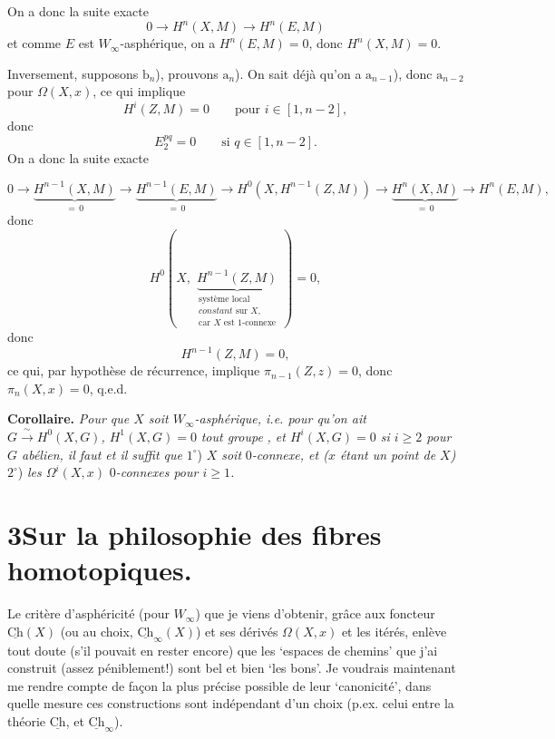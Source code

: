 \documentclass[11pt]{article}
\newcommand{\printedpage}[1]{{\reversemarginpar\marginnote{\raggedleft\scriptsize ed.~#1}}}
\newcommand{\msp}[1]{\marginpar{\raggedright\scriptsize ms.~#1}}
\newcommand{\Ch}{\underline{\mathrm{Ch}}}
\begin{document}
\printedpage{126}

On a donc la suite exacte
\[
0 \longrightarrow H^n(X,M) \longrightarrow H^n(E,M)
\]
et comme $E$ est $W_\infty$-asphérique, on a $H^n(E,M) = 0$, donc $H^n(X,M) = 0$.

Inversement, supposons $\mathrm{b}_n$), prouvons $\mathrm{a}_n$). On sait déjà qu'on a $\mathrm{a}_{n-1}$), donc $\mathrm{a}_{n-2}$ pour $\Omega(X,x)$, ce qui implique
\[
H^i(Z,M) = 0 \qquad \text{pour } i \in [1,n-2],
\]
donc
\[
E_2^{pq} = 0 \qquad \text{si } q \in [1,n-2].
\]
On a donc la suite exacte

\msp{page 190}
\[
0 \longrightarrow \underbrace{H^{n-1}(X,M)}_{=\,0} \longrightarrow \underbrace{H^{n-1}(E,M)}_{=\,0} \longrightarrow H^0(X,H^{n-1}(Z,M)) \longrightarrow \underbrace{H^n(X,M)}_{=\,0} \longrightarrow H^n(E,M),
\]
donc
\[
H^0(X,\ \underbrace{H^{n-1}(Z,M)}_{\begin{array}{l}\text{système local}\\ \textit{constant}\text{ sur } X,\\ \text{car } X \text{ est 1-connexe}\end{array}}\ ) = 0,
\]
donc
\[
H^{n-1}(Z,M) = 0,
\]
ce qui, par hypothèse de récurrence, implique $\pi_{n-1}(Z,z) = 0$, donc $\pi_n(X,x) = 0$, q.e.d.

\textbf{Corollaire.} \textit{Pour que $X$ soit $W_\infty$-asphérique, i.e. pour qu'on ait $G \xrightarrow{\ \sim\ } H^0(X,G)$, $H^1(X,G) = 0$} \textit{tout groupe} \textit{, et $H^i(X,G) = 0$ si $i \geq 2$ pour $G$ abélien, il faut et il suffit que} $1^\circ$) \textit{$X$ soit} $0$\textit{-connexe, et ($x$ étant un point de $X$)} $2^\circ$) \textit{les $\Omega^i(X,x)$} $0$\textit{-connexes pour $i \geq 1$.}

\msp{page 191}

\section*{3\quad Sur la philosophie des fibres homotopiques.}

Le critère d'asphéricité (pour $W_\infty$) que je viens d'obtenir, grâce aux foncteur $\Ch(X)$ (ou au choix, $\Ch_\infty(X)$) et ses dérivés $\Omega(X,x)$ et les itérés, enlève tout doute (s'il pouvait en rester encore) que les `espaces de chemins' que j'ai construit (assez péniblement!) sont bel et bien `les bons'. Je voudrais maintenant me rendre compte de façon la plus précise possible de leur `canonicité', dans quelle mesure ces constructions sont indépendant d'un choix (p.ex. celui entre la théorie $\Ch$, et $\Ch_\infty$). %
\end{document}
